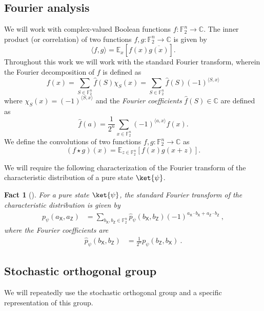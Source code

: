 \documentclass[11pt]{article}
\newcommand{\ra}{\rangle}
\newcommand{\la}{\langle}
\newtheorem{fact}[theorem]{Fact}
\newcommand{\FF}{\mathbb{F}}
\newcommand{\Exp}{{\mathbb{E}}}
\newcommand{\Z}{\mathsf{Z}}
\newcommand{\X}{\mathsf{X}}
\newcommand{\F}{\mathbb{F}}
\begin{document}
\subsection{Fourier analysis}
We will work with complex-valued Boolean functions $f: \mathbb{F}_2^n \rightarrow \mathbb{C}$. The inner product (or correlation) of two functions $f, g: \mathbb{F}_2^n \rightarrow \mathbb{C}$ is given by
\begin{equation}
    \la f , g \ra = \Exp_x [f(x) \overline{g(x)}].
\end{equation}
Throughout this work we will work with the standard Fourier transform, wherein 
  the Fourier decomposition of $f$ is defined  as
$$
f(x)=\sum_{S \in \FF_2^{n}} \widehat{f}(S)\chi_S(x)=\sum_{S \in \FF_2^{n}}  \widehat{f}(S)(-1)^{\langle S,x\rangle }
$$
where $\chi_S(x)=(-1)^{\langle S, x\rangle}$ and the \emph{Fourier coefficients} $\widehat{f}(S)\in \mathbb{C}$ are defined as
$$
 \widehat{f}(a) = \frac{1}{2^n} \sum_{x \in \FF_2^{n}} (-1)^{\langle a,x\rangle } f(x).
$$
We define the convolutions of two functions $f, g: \mathbb{F}_2^n \rightarrow \mathbb{C}$ as
\begin{equation}
    (f \star g)(x) = \Exp_{z \in \mathbb{F}_2^n} \left[f(x) g(x+z) \right].
\end{equation}

We will require the following characterization of the Fourier transform of the characteristic distribution of a pure state $\ket{\psi}$.
\begin{fact}[{\cite[Proposition 8.4]{grewal2025efficient}}]
\label{fact:fourier-duality}
    For a pure state $\ket{\psi}$, the standard Fourier transform of the characteristic distribution is given by
    \begin{align}
        p_\psi(a_\X, a_\Z) & = \sum_{b_\X, b_\Z \in \F_2^n} \widehat{p}_\psi(b_\X, b_\Z) (-1)^{a_\X \cdot b_\X + a_\Z \cdot b_\Z}\ ,
    \end{align}
    where the Fourier coefficients are 
    \begin{align}
        \widehat{p}_\psi(b_\X, b_\Z) & = \frac{1}{2^n}p_\psi(b_\Z, b_\X)\ .
    \end{align}
\end{fact}


\subsection{Stochastic orthogonal group }\label{sec:cliff_com}
We will repeatedly use the stochastic orthogonal group and a specific representation of this group.
\end{document}
